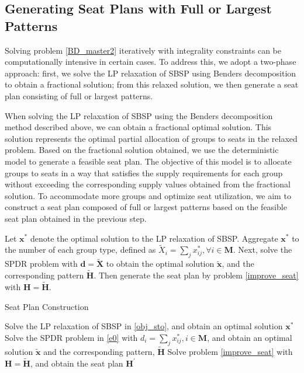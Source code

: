 \subsection{Generating Seat Plans with Full or Largest Patterns}\label{seat_assignment}
Solving problem \eqref{BD_master2} iteratively with integrality constraints can be computationally intensive in certain cases. To address this, we adopt a two-phase approach: first, we solve the LP relaxation of SBSP using Benders decomposition to obtain a fractional solution; from this relaxed solution, we then generate a seat plan consisting of full or largest patterns.

When solving the LP relaxation of SBSP using the Benders decomposition method described above, we can obtain a fractional optimal solution. This solution represents the optimal partial allocation of groups to seats in the relaxed problem. Based on the fractional solution obtained, we use the deterministic model to generate a feasible seat plan. The objective of this model is to allocate groups to seats in a way that satisfies the supply requirements for each group without exceeding the corresponding supply values obtained from the fractional solution. To accommodate more groups and optimize seat utilization, we aim to construct a seat plan composed of full or largest patterns based on the feasible seat plan obtained in the previous step.


Let $\mathbf{x}^{*}$ denote the optimal solution to the LP relaxation of SBSP. Aggregate $\mathbf{x}^{*}$ to the number of each group type, defined as $\tilde{X}_{i} =\sum_{j} x^{*}_{ij}, \forall i \in \mathbf{M}$. Next, solve the SPDR problem with $\bm{d} = \bm{\tilde{X}}$ to obtain the optimal solution $\mathbf{\tilde{x}}$, and the corresponding pattern $\tilde{\bm{H}}$. Then generate the seat plan by problem \eqref{improve_seat} with $\bm{H}=  \tilde{\bm{H}}$.


\begin{algorithm}
  \caption{Seat Plan Construction}\label{seat_construction}
    {Solve the LP relaxation of SBSP in \eqref{obj_sto}, and obtain an optimal solution $\mathbf{x}^{*}$\;}
    {Solve the SPDR problem in \eqref{e0} with $d_{i} = \sum_{j} x^{*}_{ij}, i \in \mathbf{M}$, and obtain an optimal solution $\tilde{\mathbf{x}}$ and the corresponding pattern, $\tilde{\bm{H}}$\;}
    {Solve problem \eqref{improve_seat} with $\bm{H} = \tilde{\bm{H}}$, and obtain the seat plan $\bm{H}^{\prime}$\;}
\end{algorithm}


